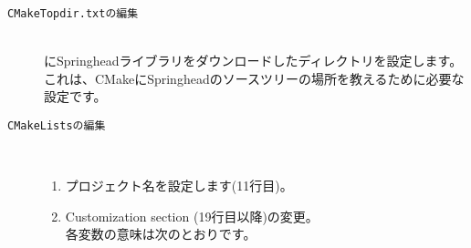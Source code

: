 \bigskip
\begin{description}
    \item[\tt{CMakeTopdir.txt}の編集]　\\
	\CMakeTopdir{}にSpringheadライブラリをダウンロードしたディレクトリを設定します。
	これは、CMakeにSpringheadのソースツリーの場所を教えるために必要な設定です。

	\begin{narrow}[s][15pt]
	\end{narrow}

    \item[\tt{CMakeLists}の編集]　\\
	\begin{enumerate}
	    \item
		プロジェクト名を設定します(11行目)。

		\begin{narrow}[s][5pt]
		\end{narrow}

	    \item
		Customization section (19行目以降)の変更。\\
		各変数の意味は次のとおりです。


\end{enumerate}
\end{description}

